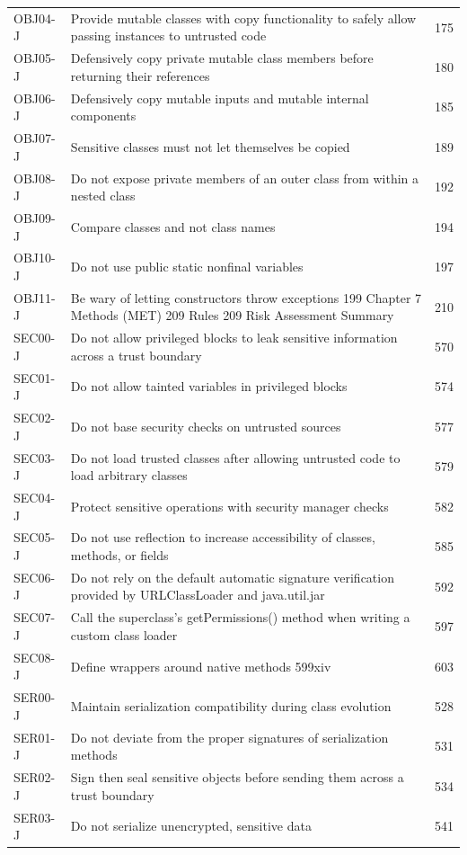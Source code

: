 \documentclass[11pt]{report}
\begin{document}
\begin{longtable}{@{}llr@{}}
OBJ04-J & Provide mutable classes with copy functionality to safely allow passing instances to untrusted code & 175\\
OBJ05-J & Defensively copy private mutable class members before returning their references & 180\\
OBJ06-J & Defensively copy mutable inputs and mutable internal components & 185\\
OBJ07-J & Sensitive classes must not let themselves be copied & 189\\
OBJ08-J & Do not expose private members of an outer class from within a nested class & 192\\
OBJ09-J & Compare classes and not class names & 194\\
OBJ10-J & Do not use public static nonfinal variables & 197\\
OBJ11-J & Be wary of letting constructors throw exceptions 199 Chapter 7 Methods (MET) 209 Rules 209 Risk Assessment Summary & 210\\
SEC00-J & Do not allow privileged blocks to leak sensitive information across a trust boundary & 570\\
SEC01-J & Do not allow tainted variables in privileged blocks & 574\\
SEC02-J & Do not base security checks on untrusted sources & 577\\
SEC03-J & Do not load trusted classes after allowing untrusted code to load arbitrary classes & 579\\
SEC04-J & Protect sensitive operations with security manager checks & 582\\
SEC05-J & Do not use reflection to increase accessibility of classes, methods, or fields & 585\\
SEC06-J & Do not rely on the default automatic signature verification provided by URLClassLoader and java.util.jar & 592\\
SEC07-J & Call the superclass’s getPermissions() method when writing a custom class loader & 597\\
SEC08-J & Define wrappers around native methods 599xiv & 603\\
SER00-J & Maintain serialization compatibility during class evolution & 528\\
SER01-J & Do not deviate from the proper signatures of serialization methods & 531\\
SER02-J & Sign then seal sensitive objects before sending them across a trust boundary & 534\\
SER03-J & Do not serialize unencrypted, sensitive data & 541\\

\end{longtable}
\end{document}

